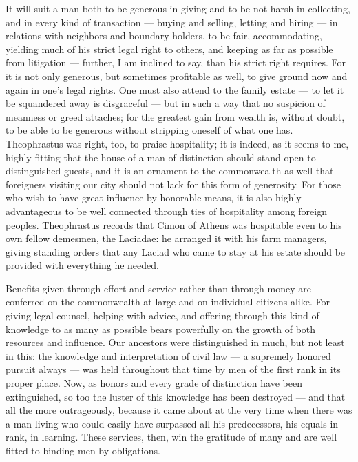  It will suit a man both to be generous in giving and to be not harsh in collecting, and in every kind of transaction — buying and selling, letting and hiring — in relations with neighbors and boundary-holders, to be fair, accommodating, yielding much of his strict legal right to others, and keeping as far as possible from litigation — further, I am inclined to say, than his strict right requires. For it is not only generous, but sometimes profitable as well, to give ground now and again in one's legal rights. One must also attend to the family estate — to let it be squandered away is disgraceful — but in such a way that no suspicion of meanness or greed attaches; for the greatest gain from wealth is, without doubt, to be able to be generous without stripping oneself of what one has. Theophrastus was right, too, to praise hospitality; it is indeed, as it seems to me, highly fitting that the house of a man of distinction should stand open to distinguished guests, and it is an ornament to the commonwealth as well that foreigners visiting our city should not lack for this form of generosity. For those who wish to have great influence by honorable means, it is also highly advantageous to be well connected through ties of hospitality among foreign peoples. Theophrastus records that Cimon of Athens was hospitable even to his own fellow demesmen, the Laciadae: he arranged it with his farm managers, giving standing orders that any Laciad who came to stay at his estate should be provided with everything he needed.

 Benefits given through effort and service rather than through money are conferred on the commonwealth at large and on individual citizens alike. For giving legal counsel, helping with advice, and offering through this kind of knowledge to as many as possible bears powerfully on the growth of both resources and influence. Our ancestors were distinguished in much, but not least in this: the knowledge and interpretation of civil law — a supremely honored pursuit always — was held throughout that time by men of the first rank in its proper place. Now, as honors and every grade of distinction have been extinguished, so too the luster of this knowledge has been destroyed — and that all the more outrageously, because it came about at the very time when there was a man living who could easily have surpassed all his predecessors, his equals in rank, in learning. These services, then, win the gratitude of many and are well fitted to binding men by obligations.

